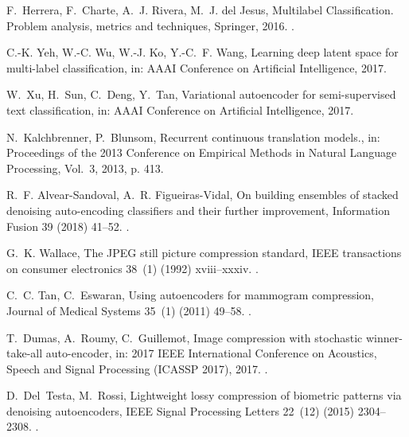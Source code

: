 \documentclass[preprint,5p,compress]{elsarticle}
\begin{document}
\begin{thebibliography}{100}
F.~Herrera, F.~Charte, A.~J. Rivera, M.~J. del Jesus, {Multilabel
  Classification. Problem analysis, metrics and techniques}, Springer, 2016.
\newblock \href {http://dx.doi.org/10.1007/978-3-319-41111-8}
  {}.

C.-K. Yeh, W.-C. Wu, W.-J. Ko, Y.-C.~F. Wang, Learning deep latent space for
  multi-label classification, in: AAAI Conference on Artificial Intelligence,
  2017.

W.~Xu, H.~Sun, C.~Deng, Y.~Tan, Variational autoencoder for semi-supervised
  text classification, in: AAAI Conference on Artificial Intelligence, 2017.

N.~Kalchbrenner, P.~Blunsom, Recurrent continuous translation models., in:
  Proceedings of the 2013 Conference on Empirical Methods in Natural Language
  Processing, Vol.~3, 2013, p. 413.

R.~F. Alvear-Sandoval, A.~R. Figueiras-Vidal, On building ensembles of stacked
  denoising auto-encoding classifiers and their further improvement,
  Information Fusion 39 (2018) 41–52.
\newblock \href {http://dx.doi.org/10.1016/j.inffus.2017.03.008}
  {}.

G.~K. Wallace, The {JPEG} still picture compression standard, IEEE transactions
  on consumer electronics 38~(1) (1992) xviii--xxxiv.
\newblock \href {http://dx.doi.org/10.1145/103085.103089}
  {}.

C.~C. Tan, C.~Eswaran, Using autoencoders for mammogram compression, Journal of
  Medical Systems 35~(1) (2011) 49--58.
\newblock \href {http://dx.doi.org/10.1007/s10916-009-9340-3}
  {}.

T.~Dumas, A.~Roumy, C.~Guillemot, Image compression with stochastic
  winner-take-all auto-encoder, in: 2017 IEEE International Conference on
  Acoustics, Speech and Signal Processing (ICASSP 2017), 2017.
\newblock \href {http://dx.doi.org/10.1109/ICASSP.2017.7952409}
  {}.

D.~Del~Testa, M.~Rossi, Lightweight lossy compression of biometric patterns via
  denoising autoencoders, IEEE Signal Processing Letters 22~(12) (2015)
  2304--2308.
\newblock \href {http://dx.doi.org/10.1109/LSP.2015.2476667}
  {}.


\end{thebibliography}
\end{document}
